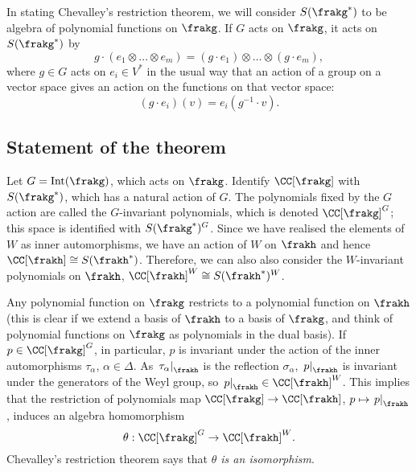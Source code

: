In stating Chevalley's restriction theorem, we will consider $S(\frakg^*)$ to be algebra of polynomial functions on $\frakg$.
If $G$ acts on $\frakg$, it acts on $S(\frakg^*)$ by
$$g \cdot (e_1 \otimes \ldots \otimes e_m) = (g\cdot e_1) \otimes \ldots \otimes (g \cdot e_m),$$
where $g \in G$ acts on $e_i \in V^*$ in the usual way that an action of a group on a vector space gives an action on the functions on that vector space:
$$(g\cdot e_i)(v) = e_i(g^{-1} \cdot v).$$

\subsection{Statement of the theorem}
Let $G = \mathrm{Int}(\frakg)$, which acts on $\frakg$.
Identify $\CC[\frakg]$ with $S(\frakg^*)$, which has a natural action of $G$.
The polynomials fixed by the $G$ action are called the $G$-invariant polynomials, which is denoted $\CC[\frakg]^G$; this space is identified with $S(\frakg^*)^G$.
Since we have realised the elements of $W$ as inner automorphisms, we have an action of $W$ on $\frakh$ and hence $\CC[\frakh] \cong S(\frakh^*)$.
Therefore, we can also also consider the $W$-invariant polynomials on $\frakh$, $\CC[\frakh]^W \cong S(\frakh^*)^W$.

Any polynomial function on $\frakg$ restricts to a polynomial function on $\frakh$ (this is clear if we extend a basis of $\frakh$ to a basis of $\frakg$, and think of polynomial functions on $\frakg$ as polynomials in the dual basis).
If $p \in \CC[\frakg]^G$, in particular, $p$ is invariant under the action of the inner automorphisms $\tau_\alpha$, $\alpha \in \Delta$.
As $\left. \tau_\alpha \right|_\frakh$ is the reflection $\sigma_\alpha$, $\left. p \right|_\frakh$ is invariant under the generators of the Weyl group, so $\left. p \right|_\frakh \in \CC[\frakh]^W$.
This implies that the restriction of polynomials map $\CC[\frakg] \to \CC[\frakh]$, $p \mapsto \left. p \right|_\frakh$, induces an algebra homomorphism
$$\theta: \CC[\frakg]^G \to \CC[\frakh]^W.$$
Chevalley's restriction theorem says that \emph{$\theta$ is an isomorphism}.

